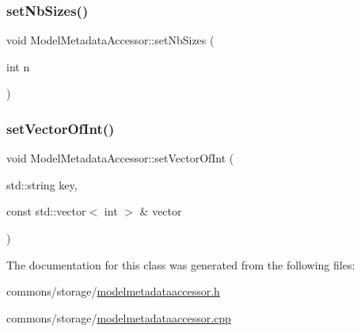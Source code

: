 \subsubsection{\texorpdfstring{setNbSizes()}{setNbSizes()}}
{\footnotesize\ttfamily void Model\+Metadata\+Accessor\+::set\+Nb\+Sizes (\begin{DoxyParamCaption}\item[{int}]{n }\end{DoxyParamCaption})}

\mbox{\label{class_model_metadata_accessor_acd778eacdad772a4d7bf5d203ea5a99c}} 
\subsubsection{\texorpdfstring{setVectorOfInt()}{setVectorOfInt()}}
{\footnotesize\ttfamily void Model\+Metadata\+Accessor\+::set\+Vector\+Of\+Int (\begin{DoxyParamCaption}\item[{std\+::string}]{key,  }\item[{const std\+::vector$<$ int $>$ \&}]{vector }\end{DoxyParamCaption})}



The documentation for this class was generated from the following files\+:\begin{DoxyCompactItemize}
\item 
commons/storage/\mbox{\hyperlink{modelmetadataaccessor_8h}{modelmetadataaccessor.\+h}}\item 
commons/storage/\mbox{\hyperlink{modelmetadataaccessor_8cpp}{modelmetadataaccessor.\+cpp}}\end{DoxyCompactItemize}
